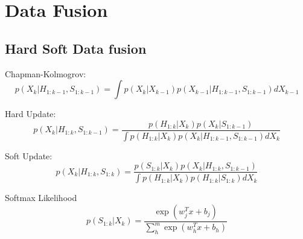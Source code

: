 \chapter{Data Fusion} \label{Chapter: Derivations}

\section{Hard Soft Data fusion}

\newcommand{\CP}[2]{\ensuremath{p(#1|#2)}} %

\newcommand{\tstamp}{\ensuremath{k}}
\newcommand{\state}{\ensuremath{X}}
\newcommand{\statei}{\ensuremath{x}}
\newcommand{\stateTime}{\ensuremath{\state_{\tstamp}}}
\newcommand{\stateTimePri}{\ensuremath{\state_{\tstamp-1}}}

\newcommand{\hard}{\ensuremath{H}}
\newcommand{\hardTime}{\ensuremath{\hard_\tstamp}}
\newcommand{\hardRange}[2]{\ensuremath{\hard_{#1:#2}}}
\newcommand{\hardUpToPri}{\ensuremath{\hardRange{1}{\tstamp-1}}}
\newcommand{\hardUpToTime}{\ensuremath{\hardRange{1}{\tstamp}}}

\newcommand{\soft}{\ensuremath{S}}
\newcommand{\softTime}{\ensuremath{\soft_\tstamp}}
\newcommand{\softRange}[2]{\ensuremath{\soft_{#1:#2}}}
\newcommand{\softUpToPri}{\ensuremath{\softRange{1}{\tstamp-1}}}
\newcommand{\softUpToTime}{\ensuremath{\softRange{1}{\tstamp}}}

\newcommand{\smWeight}{\ensuremath{w}}
\newcommand{\smCat}{\ensuremath{j}}
\newcommand{\smBias}{\ensuremath{b}}
\newcommand{\smNumCat}{\ensuremath{m}}

Chapman-Kolmogrov:
\begin{equation}
\CP{\stateTime}{\hardUpToPri,\softUpToPri}= \int \CP{\stateTime}{\stateTimePri}\CP{\stateTimePri}{\hardUpToPri,\softUpToPri} d\stateTimePri
\end{equation}

Hard Update:
\begin{equation}
\CP{\stateTime}{\hardUpToTime,\softUpToPri}=\frac{\CP{\hardUpToTime}{\stateTime}\CP{\stateTime}{\softUpToPri}}{\int \CP{\hardUpToTime}{\stateTime}\CP{\stateTime}{\hardUpToPri,\softUpToPri}d\stateTime}
\end{equation}

Soft Update:
\begin{equation}
\CP{\stateTime}{\hardUpToTime,\softUpToTime}= \frac{\CP{\softUpToTime}{\stateTime}\CP{\stateTime}{\hardUpToTime, \softUpToPri}}{\int \CP{\hardUpToTime}{\stateTime}\CP{\hardUpToTime}{\softUpToTime}d\stateTime}
\end{equation}

Softmax Likelihood
\begin{equation}
\CP{\softUpToTime}{\stateTime}=\frac{\exp(\smWeight_\smCat^T \statei +\smBias_\smCat)}{\sum^\smNumCat_h\exp(\smWeight_h^T\statei +\smBias_h)}
\end{equation}


